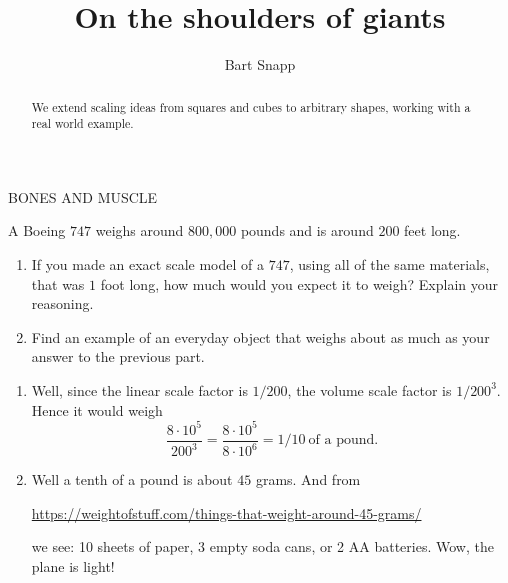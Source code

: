 \documentclass[handout,nooutcomes,noauthor,hints]{ximera}
\title{On the shoulders of giants}
\author{Bart Snapp}
\begin{document}
\begin{abstract}
  We extend scaling ideas from squares and cubes to arbitrary shapes,
  working with a real world example.
\end{abstract}
\maketitle

\begin{listOutcomes}
\item 
\item 
\item 
\item 
\end{listOutcomes}

\mynewpage
\begin{question}
  BONES AND MUSCLE
\end{question}
\mynewpage


\begin{question}
  A Boeing $747$ weighs around $800,000$ pounds and is around $200$
  feet long.
  \begin{enumerate}
    \item If you made an exact scale model of a $747$, using all of
      the same materials, that was $1$ foot long, how much would you
      expect it to weigh? Explain your reasoning.
    \item Find an example of an everyday object that weighs about as
      much as your answer to the previous part.
  \end{enumerate}
      \begin{freeResponse}
        \begin{enumerate}
          \item Well, since the linear scale factor is $1/200$, the volume scale
          factor is $1/200^3$. Hence it would weigh
          \[
          \frac{8\cdot10^5}{200^3} =\frac{8\cdot10^5}{8\cdot 10^6}=1/10~\text{of a pound.}
          \]
        \item Well a tenth of a pound is about $45$ grams. And from
          \begin{center}
          \url{https://weightofstuff.com/things-that-weight-around-45-grams/}
          \end{center}
          we see: 10 sheets of paper, 3 empty soda cans, or 2 AA
          batteries. Wow, the plane is light!
        \end{enumerate}
        \end{freeResponse}
\end{question}
\mynewpage
 
\end{document}
